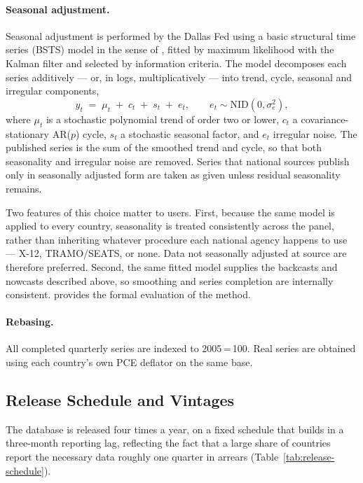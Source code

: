 \paragraph{Seasonal adjustment.}
Seasonal adjustment is performed by the Dallas Fed using a
basic structural time series (BSTS) model in the sense of
\citet{harvey1989}, fitted by maximum likelihood with the Kalman filter and
selected by information criteria. The model decomposes each series
additively --- or, in logs, multiplicatively --- into trend, cycle, seasonal
and irregular components,
\begin{equation}
  \label{eq:bsts}
  y_t \;=\; \mu_t \;+\; c_t \;+\; s_t \;+\; e_t,
  \qquad e_t \sim \mathrm{NID}\!\left(0, \sigma_e^2\right),
\end{equation}
where $\mu_t$ is a stochastic polynomial trend of order two or lower, $c_t$ a
covariance-stationary AR($p$) cycle, $s_t$ a stochastic seasonal factor, and
$e_t$ irregular noise. The published series is the sum of the smoothed trend
and cycle, so that both seasonality and irregular noise are removed. Series
that national sources publish only in seasonally adjusted form are taken as
given unless residual seasonality remains.

Two features of this choice matter to users. First, because the same model is
applied to every country, seasonality is treated consistently across the
panel, rather than inheriting whatever procedure each national agency
happens to use --- X-12, TRAMO/SEATS, or none. Data not seasonally adjusted at
source are therefore preferred. Second, the same fitted model supplies the
backcasts and nowcasts described above, so smoothing and series completion
are internally consistent. \citet{martinezgarcia2014} provides the formal
evaluation of the method.

\paragraph{Rebasing.}
All completed quarterly series are indexed to 2005\,=\,100. Real series are
obtained using each country's own PCE deflator on the same base.

\subsection{Release Schedule and Vintages}
\label{subsec:release}

The database is released four times a year, on a fixed schedule that builds
in a three-month reporting lag, reflecting the fact that a large share of
countries report the necessary data roughly one quarter in arrears
(Table~\ref{tab:release-schedule}).

